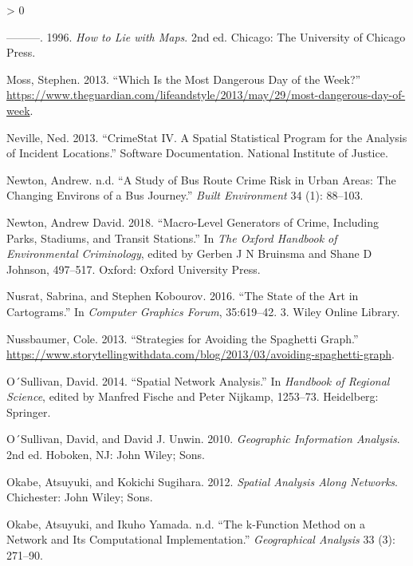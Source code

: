 \documentclass[
  krantz2]{krantz}
\newlength{\cslhangindent}
\newenvironment{CSLReferences}[2] %
 {%
  \setlength{\parindent}{0pt}
  \ifodd #1 \everypar{\setlength{\hangindent}{\cslhangindent}}\ignorespaces\fi
  \ifnum #2 > 0
  \setlength{\parskip}{#2\baselineskip}
  \fi
 }%
 {}
\begin{document}
\begin{CSLReferences}{1}{0}
\leavevmode\hypertarget{ref-Monmonier_1996}{}%
---------. 1996. \emph{How to Lie with Maps}. 2nd ed. Chicago: The University of Chicago Press.

\leavevmode\hypertarget{ref-Moss_2013}{}%
Moss, Stephen. 2013. {``Which Is the Most Dangerous Day of the Week?''} \url{https://www.theguardian.com/lifeandstyle/2013/may/29/most-dangerous-day-of-week}.

\leavevmode\hypertarget{ref-Neville_2013}{}%
Neville, Ned. 2013. {``CrimeStat IV. A Spatial Statistical Program for the Analysis of Incident Locations.''} Software Documentation. National Institute of Justice.

\leavevmode\hypertarget{ref-Newton_2008}{}%
Newton, Andrew. n.d. {``A Study of Bus Route Crime Risk in Urban Areas: The Changing Environs of a Bus Journey.''} \emph{Built Environment} 34 (1): 88--103.

\leavevmode\hypertarget{ref-Newton_2018}{}%
Newton, Andrew David. 2018. {``Macro-Level Generators of Crime, Including Parks, Stadiums, and Transit Stations.''} In \emph{The Oxford Handbook of Environmental Criminology}, edited by Gerben J N Bruinsma and Shane D Johnson, 497--517. Oxford: Oxford University Press.

\leavevmode\hypertarget{ref-Nusrat_2016}{}%
Nusrat, Sabrina, and Stephen Kobourov. 2016. {``The State of the Art in Cartograms.''} In \emph{Computer Graphics Forum}, 35:619--42. 3. Wiley Online Library.

\leavevmode\hypertarget{ref-Nussbaumer_2013}{}%
Nussbaumer, Cole. 2013. {``Strategies for Avoiding the Spaghetti Graph.''} \url{https://www.storytellingwithdata.com/blog/2013/03/avoiding-spaghetti-graph}.

\leavevmode\hypertarget{ref-OSullivan_2014}{}%
O´Sullivan, David. 2014. {``Spatial Network Analysis.''} In \emph{Handbook of Regional Science}, edited by Manfred Fische and Peter Nijkamp, 1253--73. Heidelberg: Springer.

\leavevmode\hypertarget{ref-OSullivan_2010}{}%
O´Sullivan, David, and David J. Unwin. 2010. \emph{Geographic Information Analysis}. 2nd ed. Hoboken, NJ: John Wiley; Sons.

\leavevmode\hypertarget{ref-Okabe_2012}{}%
Okabe, Atsuyuki, and Kokichi Sugihara. 2012. \emph{Spatial Analysis Along Networks}. Chichester: John Wiley; Sons.

\leavevmode\hypertarget{ref-Okabe_2001}{}%
Okabe, Atsuyuki, and Ikuho Yamada. n.d. {``The k-Function Method on a Network and Its Computational Implementation.''} \emph{Geographical Analysis} 33 (3): 271--90.


\end{CSLReferences}
\end{document}
